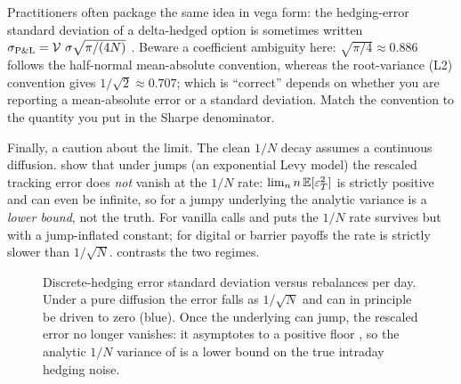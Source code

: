 Practitioners often package the same idea in vega form: the hedging-error standard deviation of a delta-hedged option is sometimes written $\sigma_{\text{P\&L}} = \operatorname{\mathcal{V}}\,\sigma\sqrt{\pi/(4N)}$ \citep[][context only]{Bennett2014}. Beware a coefficient ambiguity here: $\sqrt{\pi/4} \approx 0.886$ follows the half-normal mean-absolute convention, whereas the root-variance (L2) convention gives $1/\sqrt{2} \approx 0.707$; which is ``correct'' depends on whether you are reporting a mean-absolute error or a standard deviation. Match the convention to the quantity you put in the Sharpe denominator.

Finally, a caution about the limit. The clean $1/N$ decay assumes a continuous diffusion. \citet{BrodenTankov2010} show that under jumps (an exponential Levy model) the rescaled tracking error does \emph{not} vanish at the $1/N$ rate: $\lim_{n} n\,\mathbb{E}[\varepsilon_T^2]$ is strictly positive and can even be infinite, so for a jumpy underlying the analytic variance is a \emph{lower bound}, not the truth. For vanilla calls and puts the $1/N$ rate survives but with a jump-inflated constant; for digital or barrier payoffs the rate is strictly slower than $1/\sqrt{N}$.  contrasts the two regimes.

\begin{figure}[ht]
\centering
{}
\caption{Discrete-hedging error standard deviation versus rebalances per day. Under a pure diffusion the error falls as $1/\sqrt{N}$ and can in principle be driven to zero (blue). Once the underlying can jump, the rescaled error no longer vanishes: it asymptotes to a positive floor \citep[red,][]{BrodenTankov2010}, so the analytic $1/N$ variance of  is a lower bound on the true intraday hedging noise.}
\label{fig:ivrv:error-vs-n}
\end{figure}

